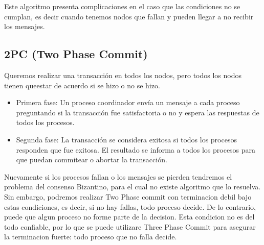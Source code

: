 \documentclass{article}
\begin{document}
Este algoritmo presenta complicaciones en el caso que las condiciones no se cumplan, es decir cuando tenemos nodos que fallan y pueden llegar a no recibir los mensajes.


\subsection{2PC (Two Phase Commit)}

Queremos realizar una transacción en todos los nodos, pero todos los nodos tienen queestar de acuerdo si se hizo o no se hizo.

\begin{itemize}
 \item Primera fase: Un proceso coordinador envía un mensaje a cada proceso preguntando si la transacción fue satisfactoria o no y espera las respuestas de todos los procesos.
 \item Segunda fase: La transacción se considera exitosa si todos los procesos responden que fue exitosa. El resultado se informa a todos los procesos para que puedan commitear o abortar la transacción.
\end{itemize}

Nuevamente si los procesos fallan o los mensajes se pierden tendremos el problema del consenso Bizantino, para el cual no existe algoritmo que lo resuelva. Sin embargo, podremos realizar Two Phase commit con terminacion debil bajo estas condiciones, es decir, si no hay fallas, todo proceso decide. De lo contrario, puede que algun proceso no forme parte de la decision. Esta condicion no es del todo confiable, por lo que se puede utilizare Three Phase Commit para asegurar la terminacion fuerte: todo proceso que no falla decide.
\end{document}
